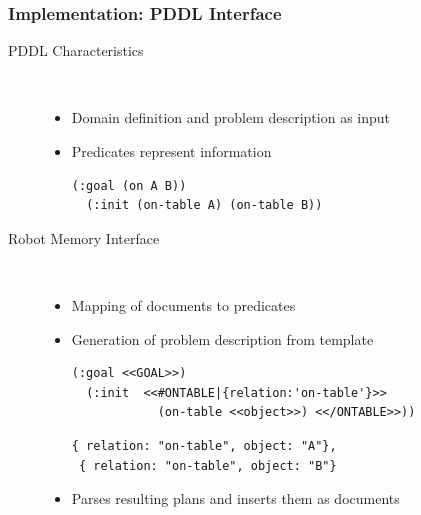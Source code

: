 \begin{frame}[fragile]
  \frametitle{Implementation: PDDL Interface}
  \begin{description}
  \item[PDDL Characteristics]%
                \hfill \\
    \begin{itemize}
    \item Domain definition and problem description as input %
    \item Predicates represent information
\begin{lstlisting}[style=SmallSlidePDDL,
  framexleftmargin=1pt, xleftmargin=1pt,linewidth=9.5cm,
 morekeywords={}, numbers=none]
  (:goal (on A B))
  (:init (on-table A) (on-table B))
\end{lstlisting}
    \end{itemize}
  \item[Robot Memory Interface]%
                \hfill \\
    \begin{itemize}
    \item Mapping of documents to predicates
    \item Generation of problem description from template
\begin{lstlisting}[style=SmallSlidePDDL,
  framexleftmargin=1pt, xleftmargin=1pt,linewidth=9.5cm,
 morekeywords={}, numbers=none]
  (:goal <<GOAL>>)
  (:init  <<#ONTABLE|{relation:'on-table'}>>
            (on-table <<object>>) <</ONTABLE>>))
\end{lstlisting}
\begin{lstlisting}[style=SmallJSON,
  framexleftmargin=0pt, xleftmargin=0pt,linewidth=9.5cm,
 morekeywords={}, numbers=none]
 { relation: "on-table", object: "A"},
 { relation: "on-table", object: "B"}
\end{lstlisting}
    \item Parses resulting plans and inserts them as documents %
    \end{itemize}
  \end{description}
\end{frame}

